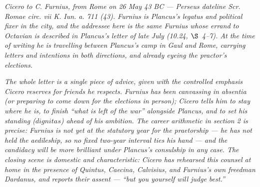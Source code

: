 
\textit{Cicero to C. Furnius, from Rome on 26 May 43 BC ---
Perseus dateline \textit{Scr. Romae circ. vii K. Iun. a. 711
(43)}. Furnius is Plancus's legatus and political fixer in
the city, and the addressee here is the same Furnius whose
errand to Octavian is described in Plancus's letter of
late July (10.24, $\S$~4--7). At the time of writing he is
travelling between Plancus's camp in Gaul and Rome,
carrying letters and intentions in both directions, and
already eyeing the practor's elections.}

\textit{The whole letter is a single piece of advice, given
with the controlled emphasis Cicero reserves for friends
he respects. Furnius has been canvassing in absentia (or
preparing to come down for the elections in person); Cicero
tells him to stay where he is, to finish ``what is left of
the war'' alongside Plancus, and to set his standing
($\textit{dignitas}$) ahead of his ambition. The career
arithmetic in section 2 is precise: Furnius is not yet at
the statutory year for the praetorship --- he has not held
the aedileship, so no fixed two-year interval ties his
hand --- and the candidacy will be more brilliant under
Plancus's consulship in any case. The closing scene is
domestic and characteristic: Cicero has rehearsed this
counsel at home in the presence of Quintus, Caecina,
Calvisius, and Furnius's own freedman Dardanus, and
reports their assent --- ``but you yourself will judge
best.''}
